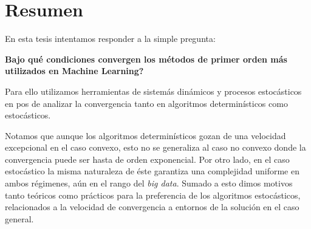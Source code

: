 \begingroup
\let\clearpage\relax
\let\cleardoublepage\relax
\let\cleardoublepage\relax

\chapter*{Resumen}

En esta tesis intentamos responder a la simple pregunta: 

\begin{center}
	\textbf{\textquestiondown Bajo qu\'e condiciones convergen los m\'etodos de primer orden m\'as utilizados en Machine Learning?} 
\end{center}

Para ello utilizamos herramientas de sistem\'as din\'amicos y procesos estoc\'asticos en pos de analizar la convergencia tanto en algoritmos determin\'isticos como estoc\'asticos. 

Notamos que aunque los algoritmos determin\'isticos gozan de una velocidad excepcional en el caso convexo, esto no se generaliza al caso no convexo donde la convergencia puede ser hasta de orden exponencial. Por otro lado, en el caso estoc\'astico la misma naturaleza de \'este garantiza una complejidad uniforme en ambos r\'egimenes, a\'un en el rango del \textit{big data}. Sumado a esto dimos motivos tanto te\'oricos como pr\'acticos para la preferencia de los algoritmos estoc\'asticos, relacionados a la velocidad de convergencia a entornos de la soluci\'on en el caso general.

\endgroup

\vfill
